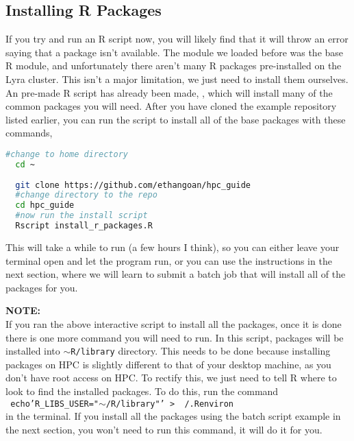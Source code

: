 \subsection{Installing R Packages}
\label{sec:install}
If you try and run an R script now, you will likely find that it will throw an error saying that a package isn't available. The module we loaded before was the base R module, and unfortunately there aren't many R packages pre-installed on the Lyra cluster. This isn't a major limitation, we just need to install them ourselves. An pre-made R script has already been made, , which will install many of the common packages you will need. After you have cloned the example repository listed earlier, you can run the script to install all of the base packages with these commands,
\begin{lstlisting}[language=bash, frame=single]
  #change to home directory
  cd ~
  
  git clone https://github.com/ethangoan/hpc_guide  
  #change directory to the repo
  cd hpc_guide
  #now run the install script
  Rscript install_r_packages.R
\end{lstlisting}
%
%
This will take a while to run (a few hours I think), so you can either leave your terminal open and let the program run, or you can use the instructions in the next section, where we will learn to submit a batch job that will install all of the packages for you.
%
%
\begin{story}
  \textbf{NOTE:}
  \\
  If you ran the above interactive script to install all the packages, once it is done there is one more command you will need to run. In this script, packages will be installed into \texttt{$\sim$R/library} directory. This needs to be done because installing packages on HPC is slightly different to that of your desktop machine, as you don't have root access on HPC. To rectify this, we just need to tell R where to look to find the installed packages. To do this, run the command
  \\
   \hspace*{1cm}\texttt{   echo'R\_LIBS\_USER="$\sim$/R/library"' >  ~/.Renviron}
  \\
  in the terminal. If you install all the packages using the batch script example in the next section, you won't need to run this command, it will do it for you.
\end{story}
